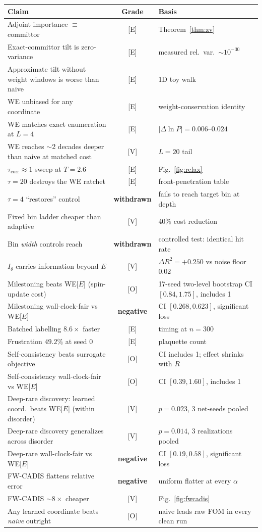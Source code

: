 \documentclass[11pt,a4paper]{article}
\begin{document}
\begin{table}[H]\centering\small
\begin{tabular}{p{7.6cm}cp{5.2cm}}\toprule
\textbf{Claim} & \textbf{Grade} & \textbf{Basis}\\\midrule
Adjoint importance $\equiv$ committor & [E] & Theorem~\ref{thm:zv}\\
Exact-committor tilt is zero-variance & [E] & measured rel.\ var.\ $\sim10^{-30}$\\
Approximate tilt without weight windows is worse than naive & [E] & 1D toy walk\\
WE unbiased for any coordinate & [E] & weight-conservation identity\\
WE matches exact enumeration at $L=4$ & [E] & $|\Delta\ln P|=0.006$--$0.024$\\
WE reaches $\sim$2 decades deeper than naive at matched cost & [V] & $L=20$ tail\\
$\tau_{\mathrm{corr}}\approx1$ sweep at $T=2.6$ & [E] & Fig.~\ref{fig:relax}\\
$\tau=20$ destroys the WE ratchet & [E] & front-penetration table\\
$\tau=4$ ``restores'' control & \textbf{withdrawn} & fails to reach target bin at depth\\
Fixed bin ladder cheaper than adaptive & [V] & 40\% cost reduction\\
Bin \emph{width} controls reach & \textbf{withdrawn} & controlled test: identical hit rate\\
$I_\theta$ carries information beyond $E$ & [V] & $\Delta R^2=+0.250$ vs noise floor $0.02$\\
Milestoning beats WE[$E$] (spin-update cost) & [O] & 17-seed two-level bootstrap CI $[0.84,1.75]$, includes 1\\
Milestoning wall-clock-fair vs WE[$E$] & \textbf{negative} & CI $[0.268,0.623]$, significant loss\\
Batched labelling $8.6\times$ faster & [E] & timing at $n=300$\\
Frustration $49.2\%$ at seed 0 & [E] & plaquette count\\
Self-consistency beats surrogate objective & [O] & CI includes 1; effect shrinks with $R$\\
Self-consistency wall-clock-fair vs WE[$E$] & [O] & CI $[0.39,1.60]$, includes 1\\
Deep-rare discovery: learned coord.\ beats WE[$E$] (within disorder) & [V] & $p=0.023$, 3 net-seeds pooled\\
Deep-rare discovery generalizes across disorder & [V] & $p=0.014$, 3 realizations pooled\\
Deep-rare wall-clock-fair vs WE[$E$] & \textbf{negative} & CI $[0.19,0.58]$, significant loss\\
FW-CADIS flattens relative error & \textbf{negative} & uniform flatter at every $\alpha$\\
FW-CADIS $\sim8\times$ cheaper & [V] & Fig.~\ref{fig:fwcadis}\\
Any learned coordinate beats \emph{naive} outright & [O] & naive leads raw FOM in every clean run\\
\bottomrule\end{tabular}
\end{table}
\end{document}
